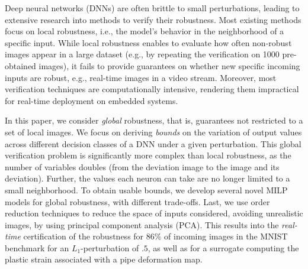 Deep neural networks (DNNs) are often brittle to small perturbations, leading to extensive research into methods to verify their robustness. Most existing methods focus on local robustness, i.e., the model's behavior in the neighborhood of a specific input. While local robustness enables to evaluate how often non-robust images appear in a large dataset (e.g., by repeating the verification on 1000 pre-obtained images), it fails to provide guarantees on whether new specific incoming inputs are robust, e.g., real-time images in a video stream. Moreover, most verification techniques are computationally intensive, rendering them impractical for real-time deployment on embedded systems. 

In this paper, we consider {\em global} robustness, that is, guarantees not restricted to a set of local images. We focus on deriving {\em bounds} on the variation of output values across different decision classes of a DNN under a given perturbation. This global verification problem is significantly more complex than local robustness, as the number of variables doubles (from the deviation image to the image and its deviation). Further, the values each neuron can take are no longer limited to a small neighborhood. To obtain usable bounds, we develop several novel  MILP models for global robustness, with different trade-offs. Last, we use order reduction techniques to reduce the space of inputs considered, avoiding unrealistic images, by using principal component analysis (PCA). This results into the {\em real-time} certification of the robustness for $86\%$ of incoming images in the MNIST benchmark for an $L_1$-perturbation of $.5$, as well as for a surrogate computing the 
plastic strain associated with a pipe deformation map.